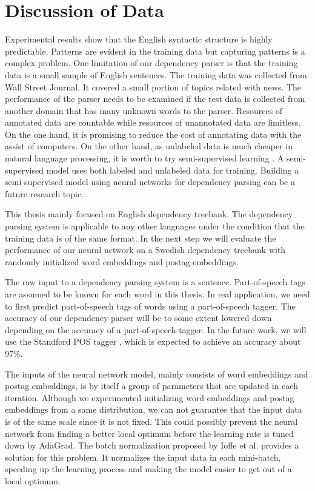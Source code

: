 %



\section{Discussion of Data}
Experimental results show that the English syntactic structure is highly predictable. Patterns are evident in the training data but capturing patterns is a complex problem. One limitation of our dependency parser is that the training data is a small sample of English sentences. The training data was collected from Wall Street Journal. It covered a small portion of topics related with news. The performance of the parser needs to be examined if the test data is collected from another domain that has many unknown words to the parser. Resources of annotated data are countable while resources of unannotated data are limitless. On the one hand, it is promising to reduce the cost of annotating data with the assist of computers. On the other hand, as unlabeled data is much cheaper in natural language processing, it is worth to try semi-supervised learning \cite{kiperwassersemi}. A semi-supervised model uses both labeled and unlabeled data for training. Building a semi-supervised model using neural networks for dependency parsing can be a future research topic.

This thesis mainly focused on English dependency treebank. The dependency parsing system is applicable to any other languages under the condition that the training data is of the same format. In the next step we will evaluate the performance of our neural network on a Swedish dependency treebank with randomly initialized word embeddings and postag embeddings.    

The raw input to a dependency parsing system is a sentence. Part-of-speech tags are assumed to be known for each word in this thesis. In real application, we need to first predict part-of-speech tags of words using a part-of-speech tagger. The accuracy of our dependency parser will be to some extent lowered down depending on the accuracy of a part-of-speech tagger. In the future work, we will use the Standford POS tagger \cite{toutanova2003feature}, which is expected to achieve an accuracy about 97\%.

The inputs of the neural network model, mainly consists of word embeddings and postag embeddings, is by itself a group of parameters that are updated in each iteration. Although we experimented initializing word embeddings and postag embeddings from a same distribution, we can not guarantee that the input data is of the same scale since it is not fixed. This could possibly prevent the neural network from finding a better local optimum before the learning rate is tuned down by AdaGrad. The batch normalization proposed by Ioffe et al. \cite{ioffe2015batch} provides a solution for this problem. It normalizes the input data in each mini-batch, speeding up the learning process and making the model easier to get out of a local optimum.

